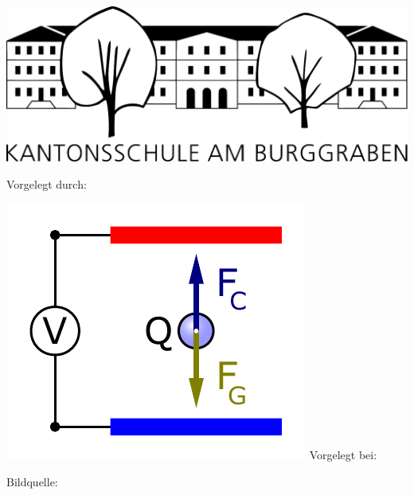 
\begin{titlepage}
	\centering
	\includegraphics[width=.3\textwidth]{title_logo.pdf}\\[.25cm]
	{\scshape\paperinstitution\par}
	\vspace{1cm}
	{\scshape\Large\papertype\par}
	\vspace{1.5cm}
	{\huge\bfseries\papertitle\par}
	\vspace{2cm}
	{\Large Vorgelegt durch:\par\paperauthor\par}
	\vfill
	\includegraphics{titelbildMaturaarbeit.pdf}
	\vfill
	Vorgelegt bei:\par
	{\sc\papersupervisor\par}
	\vspace{0.5cm}
	{\large\paperdate\par}
	\vfill
	{\footnotesize Bildquelle: \cite[CC-BY-SA 4.0]{wiki:xxx}}
\end{titlepage}